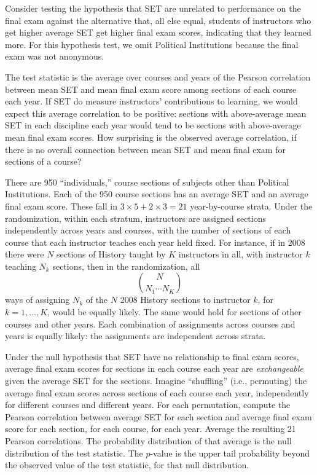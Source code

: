 \documentclass[12pt]{article}
\newcommand{\beq}{\begin{equation}}
\newcommand{\eeq}{\end{equation}}
\begin{document}
Consider testing the hypothesis that SET are unrelated to performance on the final exam
against the alternative that, all else equal, students of instructors who get higher average SET
get higher final exam scores, indicating that they learned more.
For this hypothesis test, we omit Political Institutions because the final exam was not
anonymous.

The test statistic is the average over courses and years of the Pearson correlation between
mean SET and mean final exam score among sections of each course each year.
If SET do measure instructors' contributions to learning, we would expect this average
correlation to be positive: sections with above-average mean SET in each discipline each year
would tend to be sections with above-average mean final exam scores.
How surprising is the observed average correlation, if there is no overall
connection between mean SET and mean final exam for sections of a course?

There are 950 ``individuals,'' course sections of subjects other
than Political Institutions.
Each of the 950 course sections has an average SET and an average final exam score.
These fall in $3\times5 + 2 \times 3 = 21$ year-by-course strata.
Under the randomization, within each stratum, instructors
are assigned sections independently across years and courses, with
the number of sections of each course that each instructor teaches each year held fixed.
For instance, if in 2008 there were $N$ sections of History taught by $K$ instructors in all,
with instructor $k$ teaching $N_k$ sections, then in the randomization,
all
\beq
    {N}\choose{N_1 \cdots N_K}
\eeq
ways of assigning $N_k$ of the $N$ 2008 History sections to instructor $k$, for 
$k=1, \ldots, K$,
would be equally likely.
The same would hold for sections of other courses and other years.
Each combination of assignments across courses and years is equally likely:
the assignments are independent across strata.

Under the null hypothesis that SET have no relationship to final exam scores,
average final exam scores for sections in each course each year are \emph{exchangeable} 
given the average SET for the sections.
Imagine ``shuffling'' (i.e., permuting)
the average final exam scores across sections of each course
each year, independently
for different courses and different years.
For each permutation, compute the Pearson correlation between average SET for each section
and average final exam score for each section, for each course, for each year.
Average the resulting 21 Pearson correlations.
The probability distribution of that average is the null distribution of the test statistic.
The $p$-value is the upper tail probability beyond the observed value of the 
test statistic, for that null distribution.
\end{document}
